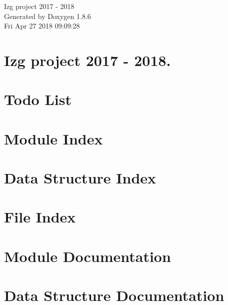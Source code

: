 \documentclass[twoside]{book}
\newcommand{\clearemptydoublepage}{%
  \newpage{\pagestyle{empty}\cleardoublepage}%
}
\begin{document}
\hypersetup{pageanchor=false}
\begin{titlepage}
\vspace*{7cm}
\begin{center}%
{\Large Izg project 2017 -\/ 2018 }\\
\vspace*{1cm}
{\large Generated by Doxygen 1.8.6}\\
\vspace*{0.5cm}
{\small Fri Apr 27 2018 09:09:28}\\
\end{center}
\end{titlepage}
\clearemptydoublepage
\tableofcontents
\clearemptydoublepage
{}
\hypersetup{pageanchor=true}

\chapter{Izg project 2017 -\/ 2018.}
\label{index}\hypertarget{index}{}
\chapter{Todo List}
\label{todo}
\hypertarget{todo}{}

\chapter{Module Index}

\chapter{Data Structure Index}

\chapter{File Index}

\chapter{Module Documentation}



\chapter{Data Structure Documentation}


















\end{document}
